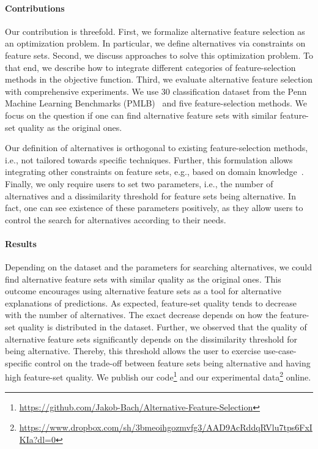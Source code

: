 \documentclass{article}
\theoremstyle{definition}
\begin{document}
\paragraph{Contributions}

Our contribution is threefold.
First, we formalize alternative feature selection as an optimization problem.
In particular, we define alternatives via constraints on feature sets.
Second, we discuss approaches to solve this optimization problem.
To that end, we describe how to integrate different categories of feature-selection methods in the objective function.
Third, we evaluate alternative feature selection with comprehensive experiments.
We use 30 classification dataset from the Penn Machine Learning Benchmarks (PMLB)~\cite{olson2017pmlb, romano2021pmlb} and five feature-selection methods.
We focus on the question if one can find alternative feature sets with similar feature-set quality as the original ones.

Our definition of alternatives is orthogonal to existing feature-selection methods, i.e., not tailored towards specific techniques.
Further, this formulation allows integrating other constraints on feature sets, e.g., based on domain knowledge~\cite{bach2022empirical, groves2015toward}.
Finally, we only require users to set two parameters, i.e., the number of alternatives and a dissimilarity threshold for feature sets being alternative.
In fact, one can see existence of these parameters positively, as they allow users to control the search for alternatives according to their needs.

\paragraph{Results}

Depending on the dataset and the parameters for searching alternatives, we could find alternative feature sets with similar quality as the original ones.
This outcome encourages using alternative feature sets as a tool for alternative explanations of predictions.
As expected, feature-set quality tends to decrease with the number of alternatives.
The exact decrease depends on how the feature-set quality is distributed in the dataset.
Further, we observed that the quality of alternative feature sets significantly depends on the dissimilarity threshold for being alternative.
Thereby, this threshold allows the user to exercise use-case-specific control on the trade-off between feature sets being alternative and having high feature-set quality.
We publish our code\footnote{\url{https://github.com/Jakob-Bach/Alternative-Feature-Selection}} and our experimental data\footnote{\url{https://www.dropbox.com/sh/3bmeoihgozmvfg3/AAD9AcRddqRVlu7tps6FxIKIa?dl=0}} online. %
\end{document}
